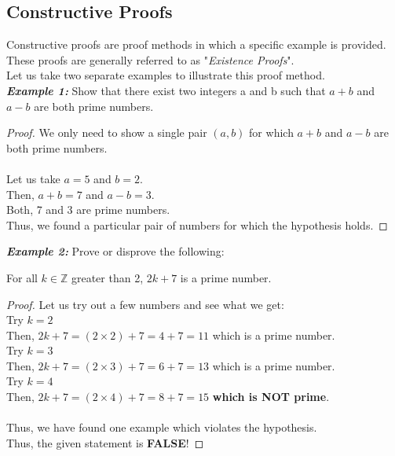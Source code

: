 \subsection{Constructive Proofs}
Constructive proofs are proof methods in which a specific example is provided.
These proofs are generally referred to as "\emph{Existence Proofs}". \\
Let us take two separate examples to illustrate this proof method. \\
\indent \textbf{\emph{Example 1:}} Show that there exist two integers a and b
such that $a + b$ and $a - b$ are both prime numbers. \\
\begin{proof}
    We only need to show a single pair $(a,b)$ for which $a + b$ and $a - b$
    are both prime numbers.\\ \\
    Let us take $a = 5$ and $b = 2$. \\
    Then, $a + b = 7$ and $a - b = 3$. \\
    Both, 7 and 3 are prime numbers. \\
    Thus, we found a particular pair of numbers for which the hypothesis holds.
\end{proof}
\indent \textbf{\emph{Example 2:}} Prove or disprove the following:
\begin{center}
    For all $k \in \mathbb{Z}$ greater than 2, $2k + 7$ is a prime number.
\end{center}
\begin{proof}
    Let us try out a few numbers and see what we get: \\
    Try $k = 2$ \\
    \indent Then, $2k + 7 = (2 \times 2) + 7 = 4 + 7 = 11$ which is a prime
    number. \\
    Try $k = 3$ \\
    \indent Then, $2k + 7 = (2 \times 3) + 7 = 6 + 7 = 13$ which is a prime
    number. \\
    Try $k = 4$ \\
    \indent Then, $2k + 7 = (2 \times 4) + 7 = 8 + 7 = 15$ \textbf{which is NOT
    prime}. \\ \\
    Thus, we have found one example which violates the hypothesis. \\
    Thus, the given statement is \textbf{FALSE}!
\end{proof}

